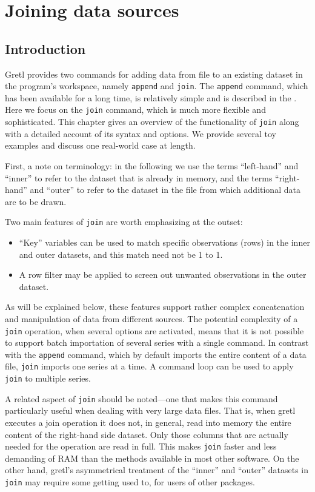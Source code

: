 \chapter{Joining data sources}
\label{chap:join}

\section{Introduction}

Gretl provides two commands for adding data from file to an existing
dataset in the program's workspace, namely \texttt{append} and
\texttt{join}. The \texttt{append} command, which has been available
for a long time, is relatively simple and is described in the
\GCR. Here we focus on the \texttt{join} command, which is much more
flexible and sophisticated. This chapter gives an overview of the
functionality of \texttt{join} along with a detailed account of its
syntax and options. We provide several toy examples and discuss one
real-world case at length.

First, a note on terminology: in the following we use the terms 
``left-hand'' and ``inner'' to refer to the dataset that is already in
memory, and the terms ``right-hand'' and ``outer'' to refer to the
dataset in the file from which additional data are to be drawn. 

Two main features of \texttt{join} are worth emphasizing at the
outset:
\begin{itemize}
\item ``Key'' variables can be used to match specific observations
  (rows) in the inner and outer datasets, and this match need not be
  1 to 1.
\item A row filter may be applied to screen out unwanted observations
  in the outer dataset.
\end{itemize}

As will be explained below, these features support rather complex
concatenation and manipulation of data from different sources. The
potential complexity of a \texttt{join} operation, when several
options are activated, means that it is not possible to support batch
importation of several series with a single command. In contrast with
the \texttt{append} command, which by default imports the entire
content of a data file, \texttt{join} imports one series at a time. A
command loop can be used to apply \texttt{join} to multiple series.

A related aspect of \texttt{join} should be noted---one that makes
this command particularly useful when dealing with very large
data files.  That is, when gretl executes a join operation it does not,
in general, read into memory the entire content of the right-hand side
dataset.  Only those columns that are actually needed for the
operation are read in full. This makes \texttt{join} faster and
less demanding of RAM than the methods available in most other
software. On the other hand, gretl's asymmetrical treatment of the
``inner'' and ``outer'' datasets in \texttt{join} may require some
getting used to, for users of other packages.

